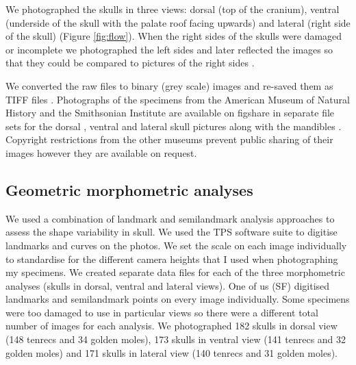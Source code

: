 \documentclass[12pt,a4paper]{article}
\begin{document}
	We photographed the skulls in three views: dorsal (top of the cranium), ventral (underside of the skull with the palate roof facing upwards) and lateral (right side of the skull) (Figure \ref{fig:flow}). When the right sides of the skulls were damaged or incomplete we photographed the left sides and later reflected the images so that they could be compared to pictures of the right sides \citep[e.g.][]{Barrow2008}.
	

	We converted the raw files to binary (grey scale) images and re-saved them as TIFF files \citep[uncompressed files preserve greater detail, ][]{RHOI2013}. 
	Photographs of the specimens from the American Museum of Natural History and the Smithsonian Institute are available on figshare in separate file sets for the dorsal \citep{Finlay2013d}, ventral \citep{Finlay2013v} and lateral \citep{Finlay2013l} skull pictures along with the mandibles \citep{Finlay2013m}. Copyright restrictions from the other museums prevent public sharing of their images however they are available on request.

\subsection{Geometric morphometric analyses}

	We used a combination of landmark and semilandmark analysis approaches to assess the shape variability in skull.  We used the TPS software suite \citep{Rohlf2013} to digitise landmarks and curves on the photos. We set the scale on each image individually to standardise for the different camera heights that I used when photographing my specimens. We created separate data files for each of the three morphometric analyses (skulls in dorsal, ventral and lateral views). One of us (SF) digitised landmarks and semilandmark points on every image individually. Some specimens were too damaged to use in particular views so there were a different total number of images for each analysis. We photographed 182 skulls in dorsal view (148 tenrecs and 34 golden moles), 173 skulls in ventral view (141 tenrecs and 32 golden moles) and 171 skulls in lateral view (140 tenrecs and 31 golden moles).
\end{document}
